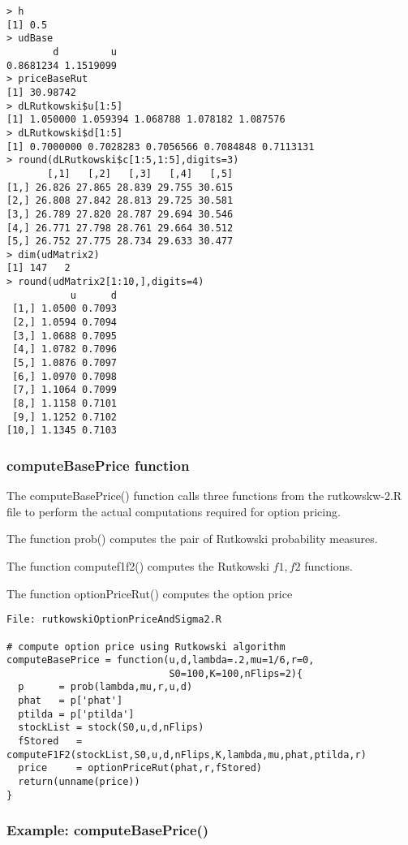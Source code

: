 \documentclass[10pt]{article}
\begin{document}
\begin{verbatim}
> h
[1] 0.5
> udBase
        d         u
0.8681234 1.1519099
> priceBaseRut
[1] 30.98742
> dLRutkowski$u[1:5]
[1] 1.050000 1.059394 1.068788 1.078182 1.087576
> dLRutkowski$d[1:5]
[1] 0.7000000 0.7028283 0.7056566 0.7084848 0.7113131
> round(dLRutkowski$c[1:5,1:5],digits=3)
       [,1]   [,2]   [,3]   [,4]   [,5]
[1,] 26.826 27.865 28.839 29.755 30.615
[2,] 26.808 27.842 28.813 29.725 30.581
[3,] 26.789 27.820 28.787 29.694 30.546
[4,] 26.771 27.798 28.761 29.664 30.512
[5,] 26.752 27.775 28.734 29.633 30.477
> dim(udMatrix2)
[1] 147   2
> round(udMatrix2[1:10,],digits=4)
           u      d
 [1,] 1.0500 0.7093
 [2,] 1.0594 0.7094
 [3,] 1.0688 0.7095
 [4,] 1.0782 0.7096
 [5,] 1.0876 0.7097
 [6,] 1.0970 0.7098
 [7,] 1.1064 0.7099
 [8,] 1.1158 0.7101
 [9,] 1.1252 0.7102
[10,] 1.1345 0.7103
\end{verbatim}

\subsubsection*{computeBasePrice function}

The computeBasePrice() function calls three functions from the rutkowskw-2.R file
to perform the actual computations required for option pricing.

The function prob() computes the pair of Rutkowski probability measures.

The function computef1f2() computes the Rutkowski $f1,f2$ functions.

The function optionPriceRut() computes the option price

\begin{verbatim}
File: rutkowskiOptionPriceAndSigma2.R

# compute option price using Rutkowski algorithm
computeBasePrice = function(u,d,lambda=.2,mu=1/6,r=0,
                            S0=100,K=100,nFlips=2){
  p      = prob(lambda,mu,r,u,d)
  phat   = p['phat']
  ptilda = p['ptilda']
  stockList = stock(S0,u,d,nFlips)
  fStored   = computeF1F2(stockList,S0,u,d,nFlips,K,lambda,mu,phat,ptilda,r)
  price     = optionPriceRut(phat,r,fStored)
  return(unname(price))
}
\end{verbatim}

\subsubsection*{Example: computeBasePrice()}
\end{document}
